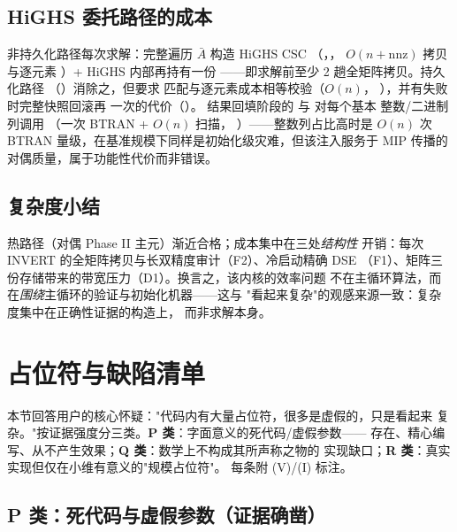 \documentclass[11pt]{ctexart}
\newcommand{\nnz}{\mathrm{nnz}}
\begin{document}
\subsection{HiGHS 委托路径的成本}
非持久化路径每次求解：完整遍历 $\bar A$ 构造 HiGHS CSC
（，，
$O(n + \nnz)$ 拷贝与逐元素 ）+ HiGHS 内部再持有一份
——即求解前至少 2 趟全矩阵拷贝。持久化路径
（）消除之，但要求
 匹配与逐元素成本相等校验（$O(n)$，
），并有失败时完整快照回滚再
 一次的代价（）。
结果回填阶段的  与
 对每个基本
整数/二进制列调用 （一次 BTRAN + $O(n)$ 扫描，
）——整数列占比高时是 $O(n)$ 次
BTRAN 量级，在基准规模下同样是初始化级灾难，但该注入服务于 MIP
传播的对偶质量，属于功能性代价而非错误。

\subsection{复杂度小结}
热路径（对偶 Phase II 主元）渐近合格；成本集中在三处\emph{结构性}
开销：每次 INVERT 的全矩阵拷贝与长双精度审计（F2）、冷启动精确 DSE
（F1）、矩阵三份存储带来的带宽压力（D1）。换言之，该内核的效率问题
不在主循环算法，而在\emph{围绕}主循环的验证与初始化机器——这与
"看起来复杂"的观感来源一致：复杂度集中在正确性证据的构造上，
而非求解本身。

\section{占位符与缺陷清单}
\label{sec:placeholders}

本节回答用户的核心怀疑："代码内有大量占位符，很多是虚假的，只是看起来
复杂。"按证据强度分三类。\textbf{P 类}：字面意义的死代码/虚假参数——
存在、精心编写、从不产生效果；\textbf{Q 类}：数学上不构成其所声称之物的
实现缺口；\textbf{R 类}：真实实现但仅在小维有意义的"规模占位符"。
每条附 (V)/(I) 标注。

\subsection{P 类：死代码与虚假参数（证据确凿）}
\end{document}
